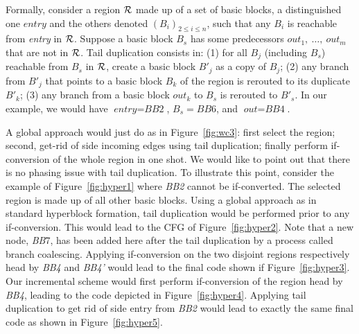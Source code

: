 Formally, consider a region $\cal R$ made up of a set of basic blocks, a distinguished one $\textit{entry}$ and the others denoted $\left(B_i\right)_{2\leq i\leq n}$, such that any $B_i$ is reachable from \textit{entry} in $\cal R$. Suppose a basic block $B_s$ has some predecessors $\textit{out}_1,\ \dots,\ \textit{out}_m$ that are not in $\cal R$. Tail duplication consists in: (1) for all $B_j$ (including $B_s$) reachable from $B_s$ in $\cal R$, create a basic block $B'_j$ as a copy of $B_j$; (2) any branch from $B'_j$ that points to a basic block $B_k$ of the region is rerouted to its duplicate $B'_k$; (3) any branch from a basic block $\textit{out}_k$ to $B_s$ is rerouted to $B'_s$. In our example, we would have $\textit{entry}=\textit{BB2}$, $B_s=\textit{BB6}$, and $\textit{out}=\textit{BB4}$.

A global approach would just do as in Figure~\ref{fig:wc3}: first select the region; second, get-rid of side incoming edges using tail duplication; finally perform if-conversion of the whole region in one shot. We would like to point out that there is no phasing issue with tail duplication. To illustrate this point, consider the example of Figure~\ref{fig:hyper1} where \textit{BB2} cannot be if-converted. The selected region is made up of all other basic blocks. Using a global approach as in standard hyperblock formation, tail duplication would be performed prior to any if-conversion. This would lead to the CFG of Figure~\ref{fig:hyper2}. Note that a new node, \textit{BB}7, has been added here after the tail duplication by a process called branch coalescing. Applying if-conversion on the two disjoint regions respectively head by \textit{BB4} and \textit{BB4'} would lead to the final code shown if Figure~\ref{fig:hyper3}. Our incremental scheme would first perform if-conversion of the region head by \textit{BB4}, leading to the code depicted in Figure~\ref{fig:hyper4}. Applying tail duplication to get rid of side entry from \textit{BB2} would lead to exactly the same final code as shown in Figure~\ref{fig:hyper5}.

